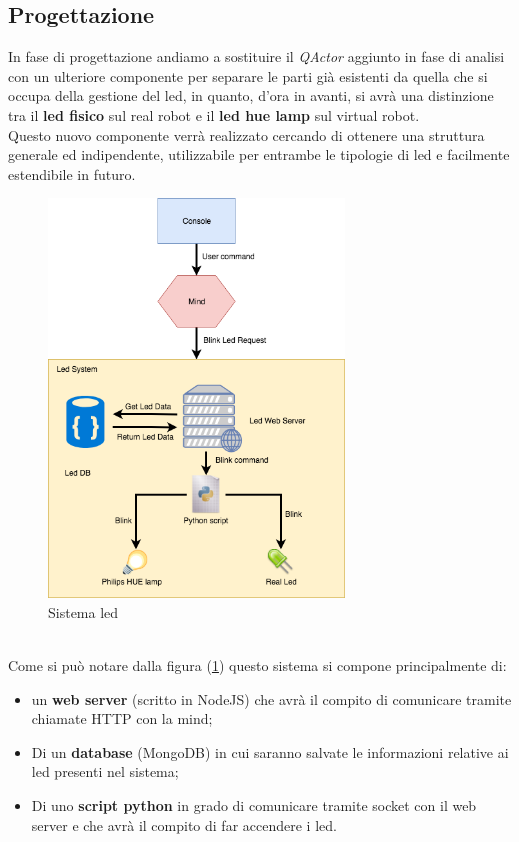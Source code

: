\documentclass{llncs}
\newcommand{\qa}{\textsf{\textit{QActor }}}
\begin{document}
\subsection{Progettazione}
\label{ProgettazioneReq4}
In fase di progettazione andiamo a sostituire il \qa aggiunto in fase di analisi con un ulteriore componente per separare le parti gi\`a esistenti da quella che si occupa della gestione del led, in quanto, d'ora in avanti, si avr\`a una distinzione tra il \textbf{led fisico} sul real robot e il \textbf{led hue lamp} sul virtual robot.\\
Questo nuovo componente verr\`a realizzato cercando di ottenere una struttura generale ed indipendente, utilizzabile per entrambe le tipologie di led e facilmente estendibile in futuro.\\
\begin{figure}
    \centering
    \includegraphics[width=0.7\textwidth]{Immagini/Requisito4/Req4MindWithServerLamp.png}
    \caption{Sistema led}
    \label{fig:ledSystemReq4}
\end{figure}
\vspace*{1ex}
\\
Come si pu\`o notare dalla figura (\hyperref[fig:ledSystemReq4]{\ref{fig:ledSystemReq4}}) questo sistema si compone principalmente di: 
\begin{itemize}
    \item un \textbf{web server} (scritto in NodeJS) che avr\`a il compito di comunicare tramite chiamate HTTP con la mind;
    \item Di un \textbf{database} (MongoDB) in cui saranno salvate le informazioni relative ai led presenti nel sistema;
    \item Di uno \textbf{script python} in grado di comunicare tramite socket con il web server e che avr\`a il compito di far accendere i led.
\end{itemize}
\end{document}
